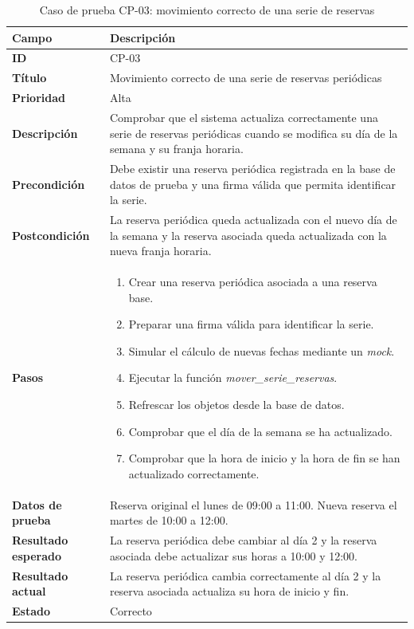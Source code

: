 \begin{table}[H]
	\centering
	\small
	\renewcommand{\arraystretch}{1.2}
	\begin{tabularx}{\textwidth}{@{}p{3.5cm}X@{}}
		\toprule
		\textbf{Campo} & \textbf{Descripción} \\
		\midrule
		\textbf{ID} & CP-03 \\
		\textbf{Título} & Movimiento correcto de una serie de reservas periódicas \\
		\textbf{Prioridad} & Alta \\
		\textbf{Descripción} & Comprobar que el sistema actualiza correctamente una serie de reservas periódicas cuando se modifica su día de la semana y su franja horaria. \\
		\textbf{Precondición} & Debe existir una reserva periódica registrada en la base de datos de prueba y una firma válida que permita identificar la serie. \\
		\textbf{Postcondición} & La reserva periódica queda actualizada con el nuevo día de la semana y la reserva asociada queda actualizada con la nueva franja horaria. \\
		\textbf{Pasos} &
		\begin{enumerate}
			\item Crear una reserva periódica asociada a una reserva base.
			\item Preparar una firma válida para identificar la serie.
			\item Simular el cálculo de nuevas fechas mediante un \textit{mock}.
			\item Ejecutar la función \textit{mover\_serie\_reservas}.
			\item Refrescar los objetos desde la base de datos.
			\item Comprobar que el día de la semana se ha actualizado.
			\item Comprobar que la hora de inicio y la hora de fin se han actualizado correctamente.
		\end{enumerate} \\
		\textbf{Datos de prueba} & Reserva original el lunes de 09:00 a 11:00. Nueva reserva el martes de 10:00 a 12:00. \\
		\textbf{Resultado esperado} & La reserva periódica debe cambiar al día 2 y la reserva asociada debe actualizar sus horas a 10:00 y 12:00. \\
		\textbf{Resultado actual} & La reserva periódica cambia correctamente al día 2 y la reserva asociada actualiza su hora de inicio y fin. \\
		\textbf{Estado} & Correcto \\
		\bottomrule
	\end{tabularx}
	\caption{Caso de prueba CP-03: movimiento correcto de una serie de reservas}
	\label{tab}
\end{table}

